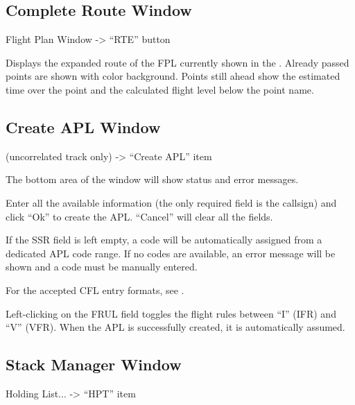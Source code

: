 \documentclass[a4paper,oneside,11pt]{memoir}
\begin{document}
\subsection{Complete Route Window}
\label{win:crw}

Flight Plan Window -> “RTE” button

\bigskip


Displays the expanded route of the FPL currently shown in the . Already passed points are shown with  color background. Points still ahead show the estimated time over the point and the calculated flight level below the point name.

\subsection{Create APL Window}
\label{win:apl}

 (uncorrelated track only) -> “Create APL” item


\bigskip

The bottom area of the window will show status and error messages.

\bigskip

Enter all the available information (the only required field is the callsign) and click “Ok” to create the APL. “Cancel” will clear all the fields.

\bigskip

If the SSR field is left empty, a code will be automatically assigned from a dedicated APL code range. If no codes are available, an error message will be shown and a code must be manually entered.

\bigskip

For the accepted CFL entry formats, see .

\bigskip

Left-clicking on the FRUL field toggles the flight rules between “I” (IFR) and “V” (VFR).
When the APL is successfully created, it is automatically assumed.

\subsection{Stack Manager Window}
\label{win:smw}
Holding List... -> “HPT” item

\bigskip
\end{document}
